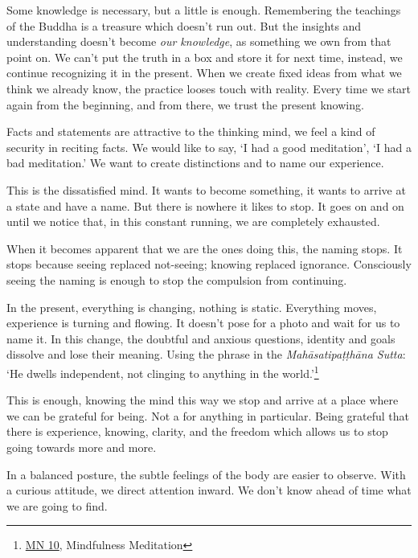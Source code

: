 
Some knowledge is necessary, but a little is enough. Remembering the
teachings of the Buddha is a treasure which doesn't run out. But the
insights and understanding doesn't become \emph{our knowledge}, as
something we own from that point on. We can't put the truth in a box and
store it for next time, instead, we continue recognizing it in the
present. When we create fixed ideas from what we think we already know,
the practice looses touch with reality. Every time we start again from
the beginning, and from there, we trust the present knowing.

Facts and statements are attractive to the thinking mind, we feel a kind
of security in reciting facts. We would like to say, `I had a good
meditation', `I had a bad meditation.' We want to create distinctions
and to name our experience.

This is the dissatisfied mind. It wants to become something, it wants to
arrive at a state and have a name. But there is nowhere it likes to
stop. It goes on and on until we notice that, in this constant running,
we are completely exhausted.

When it becomes apparent that we are the ones doing this, the naming
stops. It stops because seeing replaced not-seeing; knowing replaced
ignorance. Consciously seeing the naming is enough to stop the
compulsion from continuing.

In the present, everything is changing, nothing is static. Everything
moves, experience is turning and flowing. It doesn't pose for a photo
and wait for us to name it. In this change, the doubtful and anxious
questions, identity and goals dissolve and lose their meaning. Using the
phrase in the \emph{Mahāsatipaṭṭhāna Sutta}: `He dwells independent, not
clinging to anything in the world.'\footnote{\href{https://suttacentral.net/mn10}{MN
  10}, Mindfulness Meditation}

This is enough, knowing the mind this way we stop and arrive at a place
where we can be grateful for being. Not a for anything in particular.
Being grateful that there is experience, knowing, clarity, and the
freedom which allows us to stop going towards more and more.


In a balanced posture, the subtle feelings of the body are easier to
observe. With a curious attitude, we direct attention inward. We don't
know ahead of time what we are going to find.

